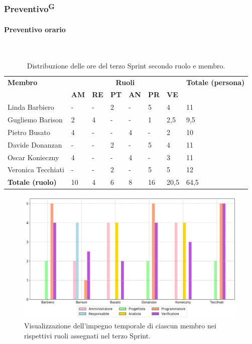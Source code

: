 \documentclass[8pt]{article}
\newcommand{\glossterm}[1]{#1\textsuperscript{G}} %
\newcommand{\subsubsubsection}[1]{\paragraph{#1}\mbox{}\\}
\begin{document}
\subsubsection{\glossterm{Preventivo}}
\subsubsubsection{Preventivo orario}
\begin{table}[ht!]
    \centering
    \begin{tabular}{p{4cm} p{1cm} p{1cm} p{1cm} p{1cm} p{1cm} p{1cm} p{3cm}}
        \toprule
        \textbf{Membro} & \multicolumn{6}{c}{\textbf{Ruoli}} & \textbf{Totale (persona)}\\
		& \textbf{AM} & \textbf{RE} & \textbf{PT} & \textbf{AN} & \textbf{PR} & \textbf{VE}\\
		\midrule
        Linda Barbiero & - & - & 2 & - & 5 & 4 & 11 \\ 
        Gugliemo Barison & 2 & 4 & - & - & 1 & 2,5 & 9,5 \\ 
        Pietro Busato & 4 & - & - & 4 & - & 2 & 10 \\ 
        Davide Donanzan & - & - & 2 & - & 5 & 4 & 11 \\ 
        Oscar Konieczny & 4 & - & - & 4 & - & 3 & 11 \\ 
        Veronica Tecchiati & - & - & 2 & - & 5 & 5 & 12 \\ 
        \midrule
        \textbf{Totale (ruolo)} & 10 & 4 & 6 & 8 & 16 & 20,5 & 64,5 \\ 
    \bottomrule
    \end{tabular}
    \caption{Distribuzione delle ore del terzo Sprint secondo ruolo e membro.}
    \label{table:Distribuzione delle ore del terzo Sprint secondo ruolo e membro}
\end{table}
\begin{figure}[ht!]
    \centering
    \includegraphics[width=15cm]{./images_pdp/istogramma_periodo_3.png}
    \caption{Visualizzazione dell’impegno temporale di ciascun membro nei rispettivi ruoli assegnati
    nel terzo Sprint.}
    \label{figure:Visualizzazione dell’impegno temporale di ciascun membro nei rispettivi ruoli
    assegnati nel terzo Sprint}
\end{figure}
\end{document}
